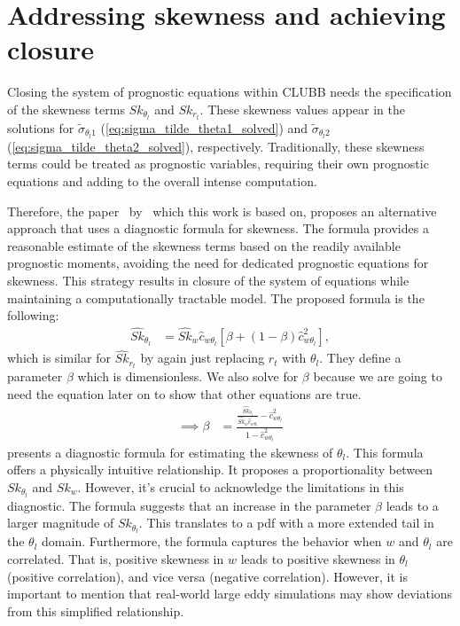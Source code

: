 \section{Addressing skewness and achieving closure}
\label{sec:addressing-skeweness-and-achieving-closure}

Closing the system of prognostic equations within \gls{CLUBB} needs the specification of
the skewness terms $Sk_{\theta_l}$ and $Sk_{r_t}$.
These skewness values appear in the solutions for $\tilde{\sigma}_{\theta_l 1}$ (\cref{eq:sigma_tilde_theta1_solved})
and $\tilde{\sigma}_{\theta_l 2}$ (\cref{eq:sigma_tilde_theta2_solved}), respectively.
Traditionally, these skewness terms could be treated as prognostic variables,
requiring their own prognostic equations and adding to the overall intense computation.

Therefore, the paper~ by~\citeauthor{larson2005using} which this work is based on,
proposes an alternative approach that uses a diagnostic formula for skewness.
The formula provides a reasonable estimate of the skewness terms
based on the readily available prognostic moments,
avoiding the need for dedicated prognostic equations for skewness.
This strategy results in closure of the system of equations
while maintaining a computationally tractable model.
The proposed formula is the following:
\begin{align}
    \label{eq:Sk_hat_thl_beta}
    \widehat{Sk}_{\theta_l}
    &= \widehat{Sk}_w \widehat{c}_{w \theta_l} \left[\beta + (1-\beta) \widehat{c}_{w \theta_l}^2 \right],
\end{align}
which is similar for $\widehat{Sk}_{r_t}$ by again just replacing $r_t$ with $\theta_l$.
They define a parameter $\beta$ which is dimensionless.
We also solve for $\beta$ because we are going to need the equation later on to show that other equations are true.
\begin{align}
    \label{eq:beta}
    \implies \beta
    &=\frac{
        \frac{\widehat{Sk}_{\theta_l}}{\widehat{Sk}_w \widehat{c}_{w \theta_l}} - \widehat{c}_{w \theta_l}^2}
    {1 - \widehat{c}_{w \theta_l}^2}
\end{align}
 presents a diagnostic formula for estimating the skewness of $\theta_l$.
This formula offers a physically intuitive relationship.
It proposes a proportionality between $Sk_{\theta_l}$ and $Sk_w$.
However, it's crucial to acknowledge the limitations in this diagnostic.
The formula suggests that an increase in the parameter $\beta$ leads to a larger magnitude of $Sk_{\theta_l}$.
This translates to a \gls{pdf} with a more extended tail in the $\theta_l$ domain.
Furthermore, the formula captures the behavior when $w$
and $\theta_l$ are correlated.
That is, positive skewness in $w$ leads to positive skewness in $\theta_l$ (positive correlation),
and vice versa (negative correlation).
However, it is important to mention that real-world large eddy simulations
may show deviations from this simplified relationship.

